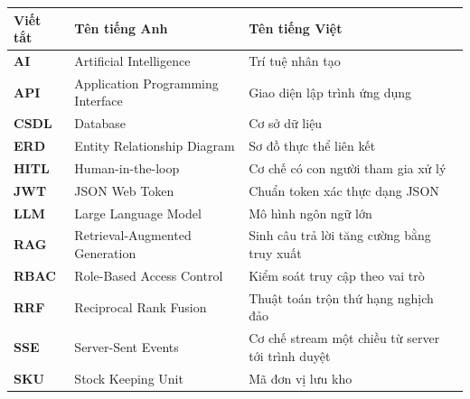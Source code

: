 \documentclass[../DoAn.tex]{subfiles}
\begin{document}
\begin{longtable}{l p{6cm} p{7cm}}
	\hline
   \textbf{Viết tắt}  & \textbf{Tên tiếng Anh}	& \textbf{Tên tiếng Việt} \\ \hline
	\textbf{AI} & Artificial Intelligence & Trí tuệ nhân tạo\\
	\textbf{API} & Application Programming Interface & Giao diện lập trình ứng dụng\\
	\textbf{CSDL} & Database & Cơ sở dữ liệu\\
	\textbf{ERD} & Entity Relationship Diagram & Sơ đồ thực thể liên kết\\
	\textbf{HITL} & Human-in-the-loop & Cơ chế có con người tham gia xử lý\\
	\textbf{JWT} & JSON Web Token & Chuẩn token xác thực dạng JSON\\
	\textbf{LLM} & Large Language Model & Mô hình ngôn ngữ lớn\\
	\textbf{RAG} & Retrieval-Augmented Generation & Sinh câu trả lời tăng cường bằng truy xuất\\
	\textbf{RBAC} & Role-Based Access Control & Kiểm soát truy cập theo vai trò\\
	\textbf{RRF} & Reciprocal Rank Fusion & Thuật toán trộn thứ hạng nghịch đảo\\
	\textbf{SSE} & Server-Sent Events & Cơ chế stream một chiều từ server tới trình duyệt\\
	\textbf{SKU} & Stock Keeping Unit & Mã đơn vị lưu kho\\

    \hline
\end{longtable}
\end{document}
